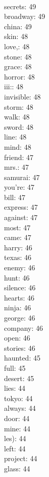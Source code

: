 \begin{multicols}{6}
  \\ secrets: 49
  \\ broadway: 49
  \\ china: 49
  \\ skin: 48
  \\ love,: 48
  \\ stone: 48
  \\ grace: 48
  \\ horror: 48
  \\ iii:: 48
  \\ invisible: 48
  \\ storm: 48
  \\ walk: 48
  \\ sword: 48
  \\ line: 48
  \\ mind: 48
  \\ friend: 47
  \\ mrs.: 47
  \\ samurai: 47
  \\ you're: 47
  \\ bill: 47
  \\ express: 47
  \\ against: 47
  \\ most: 47
  \\ came: 47
  \\ harry: 46
  \\ texas: 46
  \\ enemy: 46
  \\ hunt: 46
  \\ silence: 46
  \\ hearts: 46
  \\ ninja: 46
  \\ george: 46
  \\ company: 46
  \\ open: 46
  \\ stories: 46
  \\ haunted: 45
  \\ full: 45
  \\ desert: 45
  \\ lies: 44
  \\ tokyo: 44
  \\ always: 44
  \\ door: 44
  \\ mine: 44
  \\ les): 44
  \\ left: 44
  \\ project: 44
  \\ glass: 44

\end{multicols}
